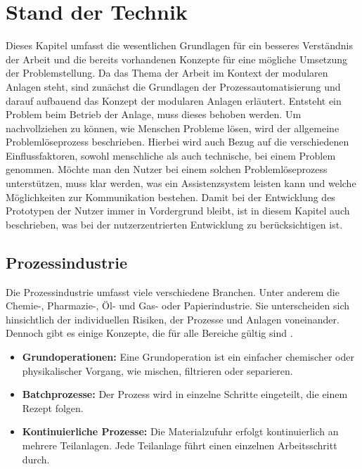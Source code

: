 
\chapter{Stand der Technik}
\label{sec:StandDerTechnik}
Dieses Kapitel umfasst die wesentlichen Grundlagen für ein besseres Verständnis der Arbeit und die bereits vorhandenen Konzepte für eine mögliche Umsetzung der Problemstellung. Da das Thema der Arbeit im Kontext der modularen Anlagen steht, sind zunächst die Grundlagen der Prozessautomatisierung und darauf aufbauend das Konzept der modularen Anlagen erläutert. Entsteht ein Problem beim Betrieb der Anlage, muss dieses behoben werden. Um nachvollziehen zu können, wie Menschen Probleme lösen, wird der allgemeine Problemlöseprozess beschrieben. Hierbei wird auch Bezug auf die verschiedenen Einflussfaktoren, sowohl menschliche als auch technische, bei einem Problem genommen. Möchte man den Nutzer bei einem solchen Problemlöseprozess unterstützen, muss klar werden, was ein Assistenzsystem leisten kann und welche Möglichkeiten zur Kommunikation bestehen. Damit bei der Entwicklung des Prototypen der Nutzer immer in Vordergrund bleibt, ist in diesem Kapitel auch beschrieben, was bei der nutzerzentrierten Entwicklung zu berücksichtigen ist.

\section{Prozessindustrie}
Die Prozessindustrie umfasst viele verschiedene Branchen. Unter anderem die Chemie-, Pharmazie-, Öl- und Gas- oder Papierindustrie. Sie unterscheiden sich hinsichtlich der individuellen Risiken, der Prozesse und Anlagen voneinander. Dennoch gibt es einige Konzepte, die für alle Bereiche gültig sind \cite{UrbasP2012}.
\begin{itemize}
\item \textbf{Grundoperationen:} Eine Grundoperation ist ein einfacher chemischer oder physikalischer Vorgang, wie mischen, filtrieren oder separieren.
\item \textbf{Batchprozesse:} Der Prozess wird in einzelne Schritte eingeteilt, die einem Rezept folgen.
\item \textbf{Kontinuierliche Prozesse:} Die Materialzufuhr erfolgt kontinuierlich an mehrere Teilanlagen. Jede Teilanlage führt einen einzelnen Arbeitsschritt durch.
\end{itemize}

